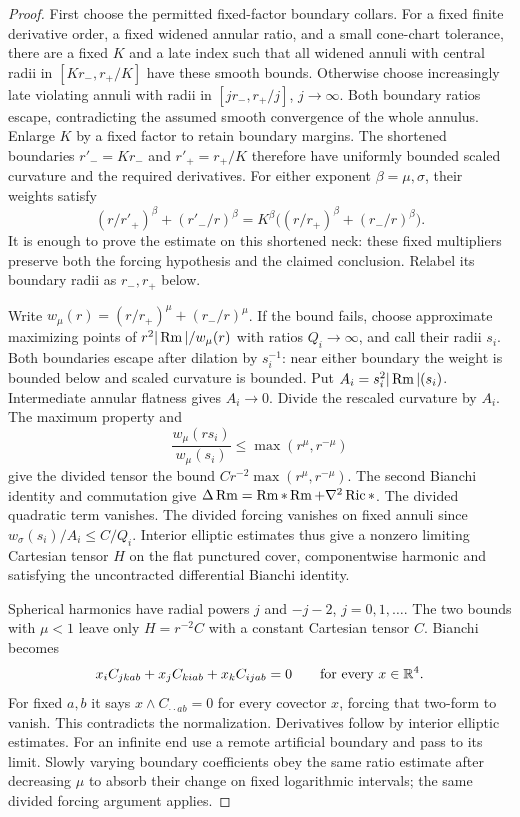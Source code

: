\begin{proof}
First choose the permitted fixed-factor boundary collars. For a fixed
finite derivative order, a fixed widened annular ratio, and a small
cone-chart tolerance, there are a fixed $K$ and a late index such that
all widened annuli with central radii in $[Kr_-,r_+/K]$ have these
smooth bounds. Otherwise choose increasingly late violating annuli
with radii in $[jr_-,r_+/j]$, $j\to\infty$. Both boundary ratios
escape, contradicting the assumed smooth convergence of the whole
annulus. Enlarge $K$ by a fixed factor to retain boundary margins.
The shortened boundaries $r'_-=Kr_-$ and $r'_+=r_+/K$ therefore have
uniformly bounded scaled curvature and the required derivatives.
For either exponent $\beta=\mu,\sigma$, their weights satisfy
\[
 (r/r'_+)^\beta+(r'_-/r)^\beta
   =K^\beta\big((r/r_+)^\beta+(r_-/r)^\beta\big).
\]
It is enough to prove the estimate on this shortened neck: these
fixed multipliers preserve both the forcing hypothesis and the
claimed conclusion. Relabel its boundary radii as $r_-,r_+$ below.

Write $w_\mu(r)=(r/r_+)^\mu+(r_-/r)^\mu$. If the bound fails, choose
approximate maximizing points of $r^2|\operatorname{Rm}|/w_\mu(r)$ with ratios
$Q_i\to\infty$, and call their radii $s_i$. Both boundaries escape
after dilation by $s_i^{-1}$: near either boundary the weight is bounded
below and scaled curvature is bounded. Put
$A_i=s_i^2|\operatorname{Rm}|(s_i)$. Intermediate annular flatness gives $A_i\to0$.
Divide the rescaled curvature by $A_i$. The maximum property and
\[
 \frac{w_\mu(rs_i)}{w_\mu(s_i)}\leq\max(r^\mu,r^{-\mu})
\]
give the divided tensor the bound
$Cr^{-2}\max(r^\mu,r^{-\mu})$.
The second Bianchi identity and commutation give
$\Delta\operatorname{Rm}=\operatorname{Rm}*\operatorname{Rm}+\nabla^2\operatorname{Ric}*$.
The divided quadratic term vanishes. The divided forcing vanishes on
fixed annuli since $w_\sigma(s_i)/A_i\leq C/Q_i$.
Interior elliptic estimates thus give a nonzero limiting Cartesian
tensor $H$ on the flat punctured cover, componentwise harmonic and
satisfying the uncontracted differential Bianchi identity.

Spherical harmonics have radial powers $j$ and $-j-2$,
$j=0,1,\ldots$. The two bounds with $\mu<1$ leave only
$H=r^{-2}C$ with a constant Cartesian tensor $C$. Bianchi becomes
\[
 x_iC_{jk ab}+x_jC_{ki ab}+x_kC_{ij ab}=0
       \qquad\text{for every }x\in\mathbb{R}^4.
\]
For fixed $a,b$ it says $x\wedge C_{\cdot\cdot ab}=0$ for every
covector $x$, forcing that two-form to vanish. This contradicts the
normalization. Derivatives follow by interior elliptic estimates.
For an infinite end use a remote artificial boundary and pass to its
limit. Slowly varying boundary coefficients obey the same ratio
estimate after decreasing $\mu$ to absorb their change on fixed
logarithmic intervals; the same divided forcing argument applies.


\end{proof}
